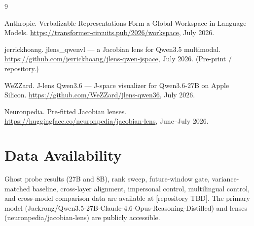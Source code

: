 \documentclass[11pt,a4paper]{article}
\begin{document}
\begin{thebibliography}{9}

Anthropic.
\newblock Verbalizable Representations Form a Global Workspace in Language Models.
\newblock \url{https://transformer-circuits.pub/2026/workspace}, July 2026.

jerrickhoang.
\newblock jlens\_qwenvl --- a Jacobian lens for Qwen3.5 multimodal.
\newblock \url{https://github.com/jerrickhoang/jlens-qwen-jspace}, July 2026. (Pre-print / repository.)

WeZZard.
\newblock J-lens Qwen3.6 --- J-space visualizer for Qwen3.6-27B on Apple Silicon.
\newblock \url{https://github.com/WeZZard/jlens-qwen36}, July 2026.

Neuronpedia.
\newblock Pre-fitted Jacobian lenses.
\newblock \url{https://huggingface.co/neuronpedia/jacobian-lens}, June--July 2026.

\end{thebibliography}

\section*{Data Availability}

Ghost probe results (27B and 8B), rank sweep, future-window gate, variance-matched baseline, cross-layer alignment, impersonal control, multilingual control, and cross-model comparison data are available at [repository TBD]. The primary model (Jackrong/Qwen3.5-27B-Claude-4.6-Opus-Reasoning-Distilled) and lenses (neuronpedia/jacobian-lens) are publicly accessible.
\end{document}
